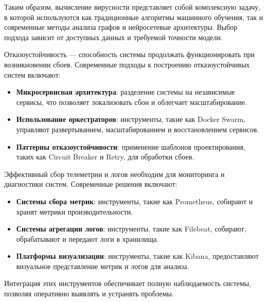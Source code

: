 Таким образом, вычисление вирусности представляет собой комплексную задачу, в которой используются как традиционные алгоритмы машинного обучения, так и современные методы анализа графов и нейросетевые архитектуры. Выбор подхода зависит от доступных данных и требуемой точности модели.

\label{subsec:anal12}
Отказоустойчивость — способность системы продолжать функционировать при возникновении сбоев.
Современные подходы к построению отказоустойчивых систем включают:
\begin{itemize}
    \item \textbf{Микросервисная архитектура}: разделение системы на независимые сервисы, что позволяет локализовать сбои и облегчает масштабирование.
    \item \textbf{Использование оркестраторов}: инструменты, такие как Docker Swarm, управляют развертыванием, масштабированием и восстановлением сервисов.
    \item \textbf{Паттерны отказоустойчивости}: применение шаблонов проектирования, таких как Circuit Breaker и Retry, для обработки сбоев.
\end{itemize}

\label{subsec:anal13}
Эффективный сбор телеметрии и логов необходим для мониторинга и диагностики систем.
Современные решения включают:
\begin{itemize}
    \item \textbf{Системы сбора метрик}: инструменты, такие как Prometheus, собирают и хранят метрики производительности.
    \item \textbf{Системы агрегации логов}: инструменты, такие как Filebeat, собирают, обрабатывают и передают логи в хранилища.
    \item \textbf{Платформы визуализации}: инструменты, такие как Kibana, предоставляют визуальное представление метрик и логов для анализа.
\end{itemize}

Интеграция этих инструментов обеспечивает полную наблюдаемость системы, позволяя оперативно выявлять и устранять проблемы.

